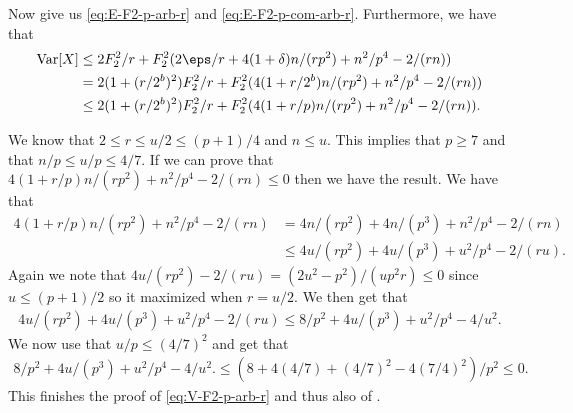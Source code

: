 Now  give us \eqref{eq:E-F2-p-arb-r}
and \eqref{eq:E-F2-p-com-arb-r}. Furthermore, we have that
\begin{align*}
    \Var[X] 
        &\le 2F_2^2/r + F_2^2 (2\eps/r + 4(1 + \delta)n / (rp^2) + n^2/p^4 - 2 /(rn))
        \\&= 2(1 + (r/2^b)^2)F_2^2/r + F_2^2(4(1 + r/2^b)n/(r p^2) + n^2/p^4 - 2/(rn)) 
        \\&\le 2(1 + (r/2^b)^2)F_2^2/r + F_2^2(4(1 + r/p)n/(r p^2) + n^2/p^4 - 2/(rn)) .
\end{align*}

We know that $2 \le r \le u/2 \le (p + 1)/4$ and $n \le u$.
This implies that $p \ge 7$ and that $n/p \le u/p \le 4/7$.
If we can prove that $4(1 + r/p)n / (rp^2) + n^2/p^4 - 2 / (rn) \le 0$ then
we have the result. We have that
\begin{align*}
   4(1 + r/p)n / (rp^2) + n^2/p^4 - 2 / (rn)
      &= 4 n/(rp^2) + 4 n /(p^3) + n^2/p^4 - 2/(rn)
      \\&\le 4u/(rp^2) + 4u/(p^3) + u^2/p^4 - 2/(ru) .
\end{align*}
Again we note that $4u/(r p^2) - 2/(ru) = (2u^2 - p^2)/(u p^2 r) \le 0$
since $u \le (p + 1)/2$ so it maximized when $r = u/2$. We then get
that
\begin{align*}
   4u/(r p^2) + 4u/(p^3) + u^2/p^4 - 2/(ru)
      \le 8/p^2 + 4u/(p^3) + u^2/p^4 - 4/u^2 .
\end{align*}
We now use that $u/p \le (4/7)^2$ and get that
\begin{align*}
   8/p^2 + 4u/(p^3) + u^2/p^4 - 4/u^2 .
      \le (8 + 4 (4/7) + (4/7)^2 - 4 (7/4)^2)/p^2
      \le 0 .
\end{align*}
This finishes the proof of \eqref{eq:V-F2-p-arb-r} and thus also of .


